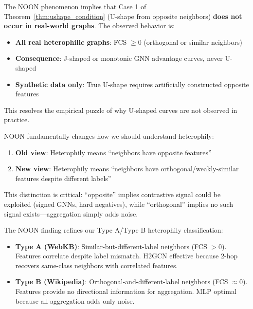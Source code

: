 \begin{corollary}
\label{cor:noon_ushape}
The NOON phenomenon implies that Case 1 of Theorem~\ref{thm:ushape_condition} (U-shape from opposite neighbors) \textbf{does not occur in real-world graphs}. The observed behavior is:
\begin{itemize}
    \item \textbf{All real heterophilic graphs}: FCS $\geq 0$ (orthogonal or similar neighbors)
    \item \textbf{Consequence}: J-shaped or monotonic GNN advantage curves, never U-shaped
    \item \textbf{Synthetic data only}: True U-shape requires artificially constructed opposite features
\end{itemize}
This resolves the empirical puzzle of why U-shaped curves are not observed in practice.
\end{corollary}

\begin{remark}
\label{rem:noon_hetero}
NOON fundamentally changes how we should understand heterophily:
\begin{enumerate}
    \item \textbf{Old view}: Heterophily means ``neighbors have opposite features''
    \item \textbf{New view}: Heterophily means ``neighbors have orthogonal/weakly-similar features despite different labels''
\end{enumerate}
This distinction is critical: ``opposite'' implies contrastive signal could be exploited (signed GNNs, hard negatives), while ``orthogonal'' implies no such signal exists---aggregation simply adds noise.
\end{remark}

\begin{remark}
\label{rem:noon_types}
The NOON finding refines our Type A/Type B heterophily classification:
\begin{itemize}
    \item \textbf{Type A (WebKB)}: Similar-but-different-label neighbors (FCS $> 0$). Features correlate despite label mismatch. H2GCN effective because 2-hop recovers same-class neighbors with correlated features.
    \item \textbf{Type B (Wikipedia)}: Orthogonal-and-different-label neighbors (FCS $\approx 0$). Features provide no directional information for aggregation. MLP optimal because all aggregation adds only noise.
\end{itemize}
\end{remark}

